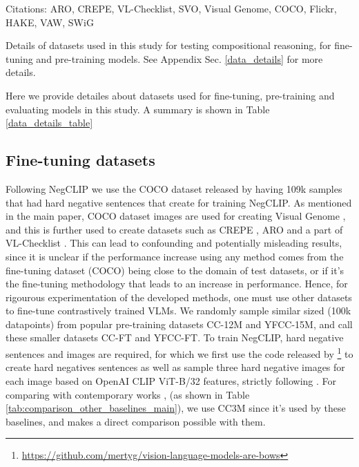 \documentclass[11pt]{article}
\newcommand{\negclip}{NegCLIP}
\begin{document}
\begin{table}[h!]
\begin{table*}[h!]
  Citations: ARO\citep{yuksekgonul2022and}, CREPE\citep{ma2022crepe}, VL-Checklist\citep{zhao2022vlchecklist}, SVO\citep{hendricks-nematzadeh-2021-probing}, Visual Genome\citep{krishnavisualgenome}, COCO\citep{lin2014microsoft}, Flickr\citep{flickr}, HAKE\citep{hake}, VAW\citep{vaw}, SWiG\citep{swig} 
  \caption{Details of datasets used in this study for testing compositional reasoning, for fine-tuning and pre-training models. See Appendix Sec. \ref{data_details} for more details.}
  \label{data_details_table}
\end{table*}
Here we provide detailes about datasets used for fine-tuning, pre-training and evaluating models in this study. A summary is shown in Table \ref{data_details_table}
\subsection{Fine-tuning datasets}
Following \negclip{} \citep{yuksekgonul2022and} we use the COCO dataset released by \citep{yuksekgonul2022and} having 109k samples that had hard negative sentences that \citep{yuksekgonul2022and} create for training NegCLIP. As mentioned in the main paper, COCO dataset images are used for creating Visual Genome \citep{krishnavisualgenome}, and this is further used to create datasets such as CREPE \citep{ma2022crepe}, ARO \citep{yuksekgonul2022and} and a part of VL-Checklist \citep{zhao2022vlchecklist}. This can lead to confounding and potentially misleading results, since it is unclear if the performance increase using any method comes from the fine-tuning dataset (COCO) being close to the domain of test datasets, or if it's the fine-tuning methodology that leads to an increase in performance. Hence, for rigourous experimentation of the developed methods, one must use other datasets to fine-tune contrastively trained VLMs. We randomly sample similar sized (100k datapoints) from popular pre-training datasets CC-12M and YFCC-15M, and call these smaller datasets CC-FT and YFCC-FT. To train \negclip{}, hard negative sentences and images are required, for which we first use the code released by \citep{yuksekgonul2022and}\footnote{\url{https://github.com/mertyg/vision-language-models-are-bows}} to create hard negatives sentences as well as sample three hard negative images for each image based on OpenAI CLIP ViT-B/32 features, strictly following \citep{yuksekgonul2022and}.
For comparing with contemporary works \citep{doveh2023teaching}, \citep{cascantebonilla2023going} (as shown in Table \ref{tab:comparison_other_baselines_main}), we use CC3M \citep{sharma-etal-2018-conceptual} since it's used by these baselines, and makes a direct comparison possible with them.

\end{table}
\end{document}
